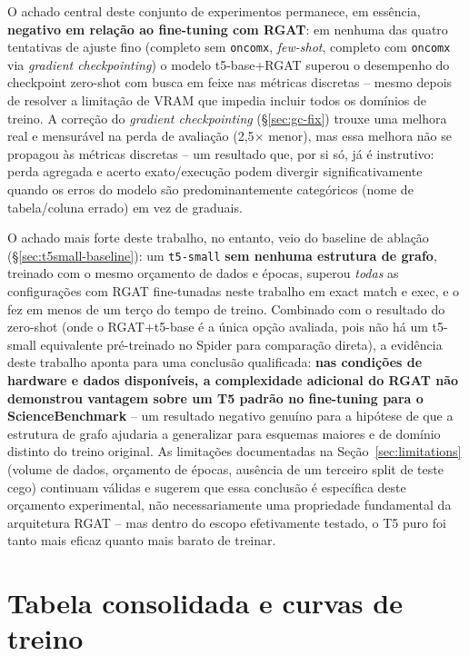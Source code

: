 O achado central deste conjunto de experimentos permanece, em essência,
\textbf{negativo em relação ao fine-tuning com RGAT}: em nenhuma das quatro
tentativas de ajuste fino (completo sem \texttt{oncomx}, \emph{few-shot},
completo com \texttt{oncomx} via \emph{gradient checkpointing}) o modelo
t5-base+RGAT superou o desempenho do checkpoint zero-shot com busca em
feixe nas métricas discretas -- mesmo depois de resolver a limitação de
VRAM que impedia incluir todos os domínios de treino. A correção do
\emph{gradient checkpointing} (\S\ref{sec:gc-fix}) trouxe uma melhora real
e mensurável na perda de avaliação (2,5$\times$ menor), mas essa melhora
não se propagou às métricas discretas -- um resultado que, por si só, já é
instrutivo: perda agregada e acerto exato/execução podem divergir
significativamente quando os erros do modelo são predominantemente
categóricos (nome de tabela/coluna errado) em vez de graduais.

O achado mais forte deste trabalho, no entanto, veio do baseline de
ablação (\S\ref{sec:t5small-baseline}): um \texttt{t5-small} \textbf{sem
nenhuma estrutura de grafo}, treinado com o mesmo orçamento de dados e
épocas, superou \emph{todas} as configurações com RGAT fine-tunadas neste
trabalho em exact match e exec, e o fez em menos de um terço do tempo de
treino. Combinado com o resultado do zero-shot (onde o RGAT+t5-base é a
única opção avaliada, pois não há um t5-small equivalente pré-treinado no
Spider para comparação direta), a evidência deste trabalho aponta para uma
conclusão qualificada: \textbf{nas condições de hardware e dados
disponíveis, a complexidade adicional do RGAT não demonstrou vantagem
sobre um T5 padrão no fine-tuning para o ScienceBenchmark} -- um resultado
negativo genuíno para a hipótese de que a estrutura de grafo ajudaria a
generalizar para esquemas maiores e de domínio distinto do treino
original. As limitações documentadas na Seção~\ref{sec:limitations}
(volume de dados, orçamento de épocas, ausência de um terceiro split de
teste cego) continuam válidas e sugerem que essa conclusão é específica
deste orçamento experimental, não necessariamente uma propriedade
fundamental da arquitetura RGAT -- mas dentro do escopo efetivamente
testado, o T5 puro foi tanto mais eficaz quanto mais barato de treinar.

\section{Tabela consolidada e curvas de treino}
\label{sec:consolidated}


